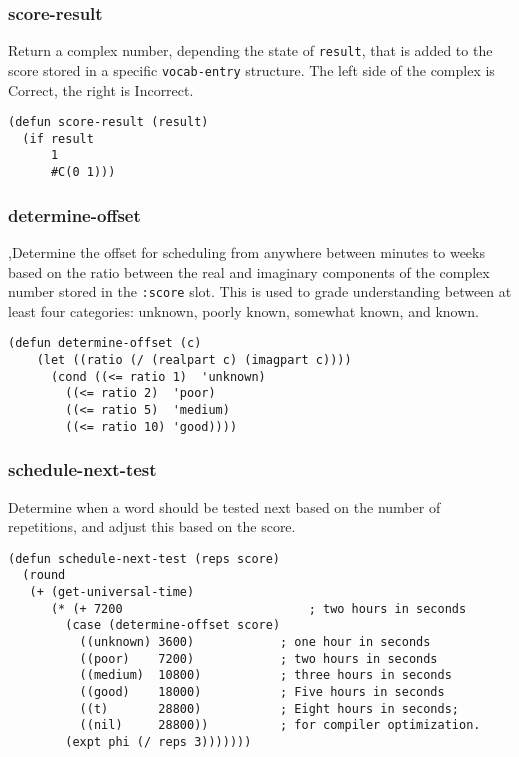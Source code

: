 \documentclass[11pt]{article}
\begin{document}
\subsubsection*{score-result}
\label{sec-8-10-3}
Return a complex number, depending the state of \texttt{result}, that is added to the
score stored in a specific \texttt{vocab-entry} structure. The left side of the complex
is Correct, the right is Incorrect.
\begin{verbatim}
(defun score-result (result)
  (if result
      1
      #C(0 1)))
\end{verbatim}
\subsubsection*{determine-offset}
\label{sec-8-10-4}
,Determine the offset for scheduling from anywhere between minutes to weeks based
on the ratio between the real and imaginary components of the complex number
stored in the \texttt{:score} slot. This is used to grade understanding between at
least four categories: unknown, poorly known, somewhat known, and known.
\begin{verbatim}
(defun determine-offset (c)
    (let ((ratio (/ (realpart c) (imagpart c))))
      (cond ((<= ratio 1)  'unknown)
	    ((<= ratio 2)  'poor)
	    ((<= ratio 5)  'medium)
	    ((<= ratio 10) 'good))))
\end{verbatim}
\subsubsection*{schedule-next-test}
\label{sec-8-10-5}
Determine when a word should be tested next based on the number of repetitions,
and adjust this based on the score.
\begin{verbatim}
(defun schedule-next-test (reps score)
  (round
   (+ (get-universal-time)
      (* (+ 7200                          ; two hours in seconds
	    (case (determine-offset score)
	      ((unknown) 3600)            ; one hour in seconds
	      ((poor)    7200)            ; two hours in seconds
	      ((medium)  10800)           ; three hours in seconds
	      ((good)    18000)           ; Five hours in seconds
	      ((t)       28800)           ; Eight hours in seconds;
	      ((nil)     28800))          ; for compiler optimization.
	    (expt phi (/ reps 3)))))))
\end{verbatim}
\end{document}
